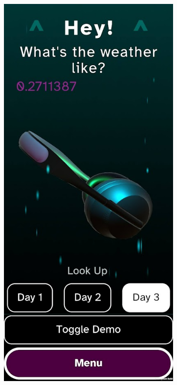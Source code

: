 \documentclass{l4proj}
\begin{document}
\begin{figure}[htb!] 
    \centering
    \begin{subfigure}[b]{0.35\textwidth}
        \includegraphics[width=\textwidth]{images/time_screenshot.jpg}

\end{subfigure}
\end{figure}
\end{document}
